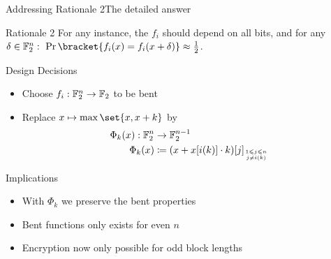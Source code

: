 \begin{frame}{Addressing Rationale 2}{The detailed answer}
    \vspace{-60pt}
    \begin{minipage}{0.985\textwidth}
    \begin{exampleblock}{Rationale 2}
        For any instance, the $f_i$ should depend on all bits, and for any $\delta \in \F_2^n:\ \Pr\bracket{f_i(x) = f_i(x + \delta)} \approx \frac{1}{2}$.
    \end{exampleblock}
    \end{minipage}

    \begin{minipage}[t][85pt][t]{0.47\textwidth}
        \begin{block}{Design Decisions}
            \begin{itemize}
                \item Choose $f_i : \mathbb{F}_2^n \to \mathbb{F}_2$ to be bent
                \item Replace $x \mapsto \max \set{x, x+k}$ by
                        \begin{align*}
                            \Phi_k(x) : \F_2^n &\to \F_2^{n-1} \\
                            \Phi_k(x) &\coloneqq (x + x[i(k)] \cdot k)[j]_{\tower{1 \leqslant j \leqslant n}{j \neq i(k)}}
                        \end{align*}
            \end{itemize}
        \end{block}
    \end{minipage}
    \hfill
    \begin{minipage}[t][85pt][t]{0.47\textwidth}
        \begin{block}{Implications}
            \begin{itemize}
                \item With $\Phi_k$ we preserve the bent properties\\[5pt]
                \item Bent functions only exists for even $n$\\[5pt]
                \item Encryption now only possible for odd block lengths
            \end{itemize}
        \end{block}
    \end{minipage}
\end{frame}

